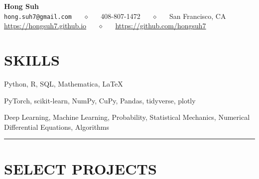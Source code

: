 \documentclass{simplecv}
\begin{document}
\thispagestyle{empty}

\begin{center}
  {\Large\bf Hong Suh} \\
  \texttt{hong.suh7@gmail.com} ~~ $\diamond$ ~~ 408-807-1472 ~~ $\diamond$ ~~ San Francisco, CA \\
  \url{https://hongsuh7.github.io} ~~ $\diamond$ ~~ \url{https://github.com/hongsuh7} \\
\end{center}


\section{SKILLS}
 Python, R, SQL, Mathematica, \LaTeX

 PyTorch, scikit-learn, NumPy, CuPy, Pandas, tidyverse, plotly

 Deep Learning, Machine Learning, Probability, Statistical Mechanics, Numerical Differential Equations, Algorithms

\rule{10cm}{0.5pt}

\vspace{-0.4cm}

\section{SELECT PROJECTS}
\end{document}
